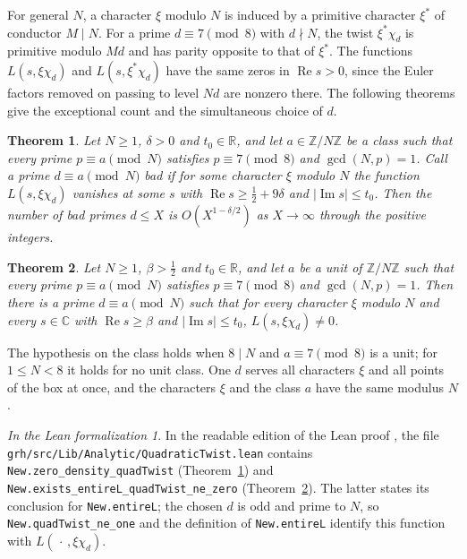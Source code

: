 \documentclass[reqno]{amsart}
\theoremstyle{definition}
\theoremstyle{plain}
\newtheorem{theorem}{Theorem}[section]
\theoremstyle{remark}
\newtheorem*{leanremark}{In the Lean formalization}
\newcommand{\Z}{\mathbb{Z}}
\newcommand{\C}{\mathbb{C}}
\newcommand{\R}{\mathbb{R}}
\renewcommand{\Re}{\operatorname{Re}}
\renewcommand{\Im}{\operatorname{Im}}
\newcommand{\tl}[1]{\texttt{#1}}
\begin{document}
For general $N$, a character $\xi$ modulo $N$ is induced by a primitive character $\xi^*$ of conductor $M \mid N$.  For a prime $d \equiv 7 \pmod 8$ with $d \nmid N$, the twist $\xi^*\chi_d$ is primitive modulo $Md$ and has parity opposite to that of $\xi^*$.  The functions $L(s, \xi\chi_d)$ and $L(s, \xi^*\chi_d)$ have the same zeros in $\Re s > 0$, since the Euler factors removed on passing to level $Nd$ are nonzero there.  The following theorems give the exceptional count and the simultaneous choice of $d$.

\begin{theorem}\label{thm:density}
Let $N \ge 1$, $\delta > 0$ and $t_0 \in \R$, and let $a \in \Z/N\Z$ be a class such that every prime $p \equiv a \pmod N$ satisfies $p \equiv 7 \pmod 8$ and $\gcd(N, p) = 1$.  Call a prime $d \equiv a \pmod N$ \emph{bad} if for some character $\xi$ modulo $N$ the function $L(s, \xi\chi_d)$ vanishes at some $s$ with $\Re s \ge \frac12 + 9\delta$ and $\lvert \Im s \rvert \le t_0$.  Then the number of bad primes $d \le X$ is $O(X^{1 - \delta/2})$ as $X \to \infty$ through the positive integers.
\end{theorem}

\begin{theorem}\label{thm:choice}
Let $N \ge 1$, $\beta > \frac12$ and $t_0 \in \R$, and let $a$ be a unit of $\Z/N\Z$ such that every prime $p \equiv a \pmod N$ satisfies $p \equiv 7 \pmod 8$ and $\gcd(N, p) = 1$.  Then there is a prime $d \equiv a \pmod N$ such that for every character $\xi$ modulo $N$ and every $s \in \C$ with $\Re s \ge \beta$ and $\lvert \Im s \rvert \le t_0$, $L(s, \xi\chi_d) \ne 0$.
\end{theorem}

The hypothesis on the class holds when $8 \mid N$ and $a \equiv 7 \pmod 8$ is a unit; for $1 \le N < 8$ it holds for no unit class.  One $d$ serves all characters $\xi$ and all points of the box at once, and the characters $\xi$ and the class $a$ have the same modulus $N$.

\begin{leanremark}
In the readable edition of the Lean proof \cite{GL}, the file \tl{grh/src/Lib/Analytic/QuadraticTwist.lean} contains \tl{New.zero\_density\_quadTwist} (Theorem~\ref{thm:density}) and \tl{New.exists\_entireL\_quadTwist\_ne\_zero} (Theorem~\ref{thm:choice}).  The latter states its conclusion for \tl{New.entireL}; the chosen $d$ is odd and prime to $N$, so \tl{New.quadTwist\_ne\_one} and the definition of \tl{New.entireL} identify this function with $L(\,\cdot\,, \xi\chi_d)$.
\end{leanremark}
\end{document}
